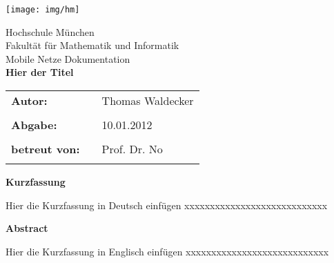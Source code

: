 %
\begin{titlepage}
\begin{flushright}
\texttt{[image: img/hm]}%
\end{flushright}

\vspace*{20mm}
\begin{center}
{\Large Hochschule München}\\
{\large Fakultät für Mathematik und Informatik}\\

\vspace*{15mm}
{\huge Mobile Netze Dokumentation }\\

\vspace*{10mm}
{\huge \bfseries{ Hier der Titel }} \\
\vspace*{15mm} 
\end{center}

\vspace*{30mm}

\begin{tabular}{lll}
\textbf{\large {Autor:}} & & \large {Thomas Waldecker}\\
& & \\

\textbf{\large {Abgabe:}} & & \large {10.01.2012}\\
& & \\

\textbf{\large {betreut von:}} & & \large {Prof. Dr. No}\\
& & \\
\end{tabular}

\end{titlepage}


\thispagestyle{empty}
\clearpage

\begin{center}
{\Large \bfseries{ Kurzfassung }}\\
\end{center}

Hier die Kurzfassung in Deutsch einfügen
xxxxxxxxxxxxxxxxxxxxxxxxxxxx


\vspace*{10mm}
\begin{center}
{\Large \bfseries{ Abstract }}\\
\end{center}

Hier die Kurzfassung in Englisch einfügen
xxxxxxxxxxxxxxxxxxxxxxxxxxxx

\leereseite
\tableofcontents
\leereseite
